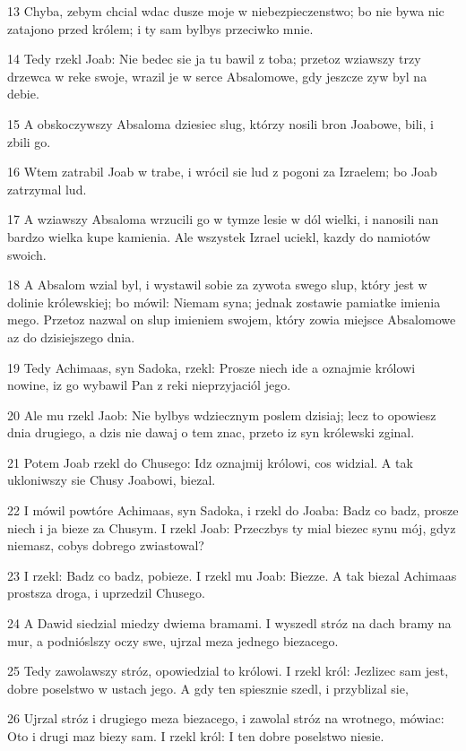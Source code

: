 \par 13 Chyba, zebym chcial wdac dusze moje w niebezpieczenstwo; bo nie bywa nic zatajono przed królem; i ty sam bylbys przeciwko mnie.
\par 14 Tedy rzekl Joab: Nie bedec sie ja tu bawil z toba; przetoz wziawszy trzy drzewca w reke swoje, wrazil je w serce Absalomowe, gdy jeszcze zyw byl na debie.
\par 15 A obskoczywszy Absaloma dziesiec slug, którzy nosili bron Joabowe, bili, i zbili go.
\par 16 Wtem zatrabil Joab w trabe, i wrócil sie lud z pogoni za Izraelem; bo Joab zatrzymal lud.
\par 17 A wziawszy Absaloma wrzucili go w tymze lesie w dól wielki, i nanosili nan bardzo wielka kupe kamienia. Ale wszystek Izrael uciekl, kazdy do namiotów swoich.
\par 18 A Absalom wzial byl, i wystawil sobie za zywota swego slup, który jest w dolinie królewskiej; bo mówil: Niemam syna; jednak zostawie pamiatke imienia mego. Przetoz nazwal on slup imieniem swojem, który zowia miejsce Absalomowe az do dzisiejszego dnia.
\par 19 Tedy Achimaas, syn Sadoka, rzekl: Prosze niech ide a oznajmie królowi nowine, iz go wybawil Pan z reki nieprzyjaciól jego.
\par 20 Ale mu rzekl Jaob: Nie bylbys wdziecznym poslem dzisiaj; lecz to opowiesz dnia drugiego, a dzis nie dawaj o tem znac, przeto iz syn królewski zginal.
\par 21 Potem Joab rzekl do Chusego: Idz oznajmij królowi, cos widzial. A tak ukloniwszy sie Chusy Joabowi, biezal.
\par 22 I mówil powtóre Achimaas, syn Sadoka, i rzekl do Joaba: Badz co badz, prosze niech i ja bieze za Chusym. I rzekl Joab: Przeczbys ty mial biezec synu mój, gdyz niemasz, cobys dobrego zwiastowal?
\par 23 I rzekl: Badz co badz, pobieze. I rzekl mu Joab: Biezze. A tak biezal Achimaas prostsza droga, i uprzedzil Chusego.
\par 24 A Dawid siedzial miedzy dwiema bramami. I wyszedl stróz na dach bramy na mur, a podnióslszy oczy swe, ujrzal meza jednego biezacego.
\par 25 Tedy zawolawszy stróz, opowiedzial to królowi. I rzekl król: Jezlizec sam jest, dobre poselstwo w ustach jego. A gdy ten spiesznie szedl, i przyblizal sie,
\par 26 Ujrzal stróz i drugiego meza biezacego, i zawolal stróz na wrotnego, mówiac: Oto i drugi maz biezy sam. I rzekl król: I ten dobre poselstwo niesie.
